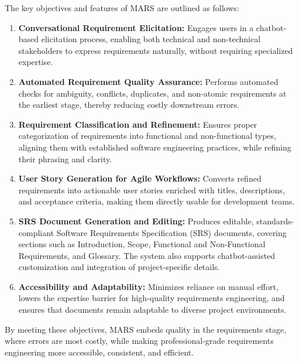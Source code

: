 The key objectives and features of MARS are outlined as follows:
\begin{enumerate}
    \item \textbf{Conversational Requirement Elicitation:}  
    Engages users in a chatbot-based elicitation process, enabling both technical and non-technical stakeholders to express requirements naturally, without requiring specialized expertise.

    \item \textbf{Automated Requirement Quality Assurance:}  
    Performs automated checks for ambiguity, conflicts, duplicates, and non-atomic requirements at the earliest stage, thereby reducing costly downstream errors.

    \item \textbf{Requirement Classification and Refinement:}  
    Ensures proper categorization of requirements into functional and non-functional types, aligning them with established software engineering practices, while refining their phrasing and clarity.

    \item \textbf{User Story Generation for Agile Workflows:}  
    Converts refined requirements into actionable user stories enriched with titles, descriptions, and acceptance criteria, making them directly usable for development teams.

    \item \textbf{SRS Document Generation and Editing:}  
    Produces editable, standards-compliant Software Requirements Specification (SRS) documents, covering sections such as Introduction, Scope, Functional and Non-Functional Requirements, and Glossary.  
    The system also supports chatbot-assisted customization and integration of project-specific details.

    \item \textbf{Accessibility and Adaptability:}  
    Minimizes reliance on manual effort, lowers the expertise barrier for high-quality requirements engineering, and ensures that documents remain adaptable to diverse project environments.
\end{enumerate}

By meeting these objectives, MARS embeds quality in the requirements stage, where errors are most costly, while making professional-grade requirements engineering more accessible, consistent, and efficient.
